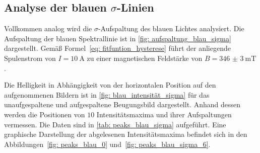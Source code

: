 \subsection{Analyse der blauen $\sigma$-Linien}
Vollkommen analog wird die $\sigma$-Aufspaltung des blauen Lichtes analysiert.
Die Aufspaltung der blauen Spektrallinie ist in \autoref{fig: aufspaltung_blau_sigma} dargestellt.
Gemäß Formel~\eqref{eq: fitfuntion_hysterese}
führt der anliegende Spulenstrom von $I = \SI{10}{\ampere}$ zu einer magnetischen Feldstärke von $B = \SI{346(3)}{\milli\tesla}$.

Die Helligkeit in Abhängigkeit von der horizontalen Position auf den aufgenommenen Bildern ist in \autoref{fig: blau_intensität_sigma} für das unaufgespaltene
und aufgespaltene Beugungsbild dargestellt. Anhand dessen werden die Positionen von $10$ Intensitätsmaxima und ihrer Aufspaltungen
vermessen. Die Daten sind in \autoref{tab: peaks_blau_sigma} aufgeführt.
Eine graphische Darstellung der abgelesenen Intensitätsmaxima befindet sich in den Abbildungen~\ref{fig: peaks_blau_0}
und~\ref{fig: peaks_blau_sigma_6}.

